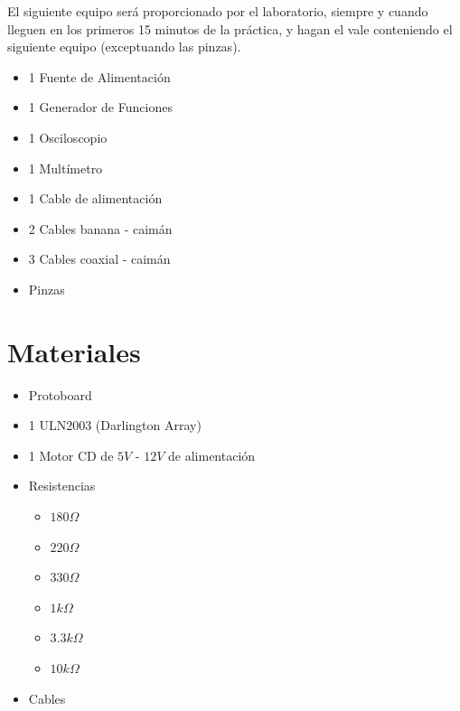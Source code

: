 	El siguiente equipo será proporcionado por el laboratorio, siempre y cuando lleguen en los primeros 15 minutos de la práctica, y hagan el vale conteniendo el siguiente equipo (exceptuando las pinzas).

	\begin{itemize}
		\item 1 Fuente de Alimentación
		\item 1 Generador de Funciones
		\item 1 Osciloscopio
		\item 1 Multímetro
		\item 1 Cable de alimentación
		\item 2 Cables banana - caimán
		\item 3 Cables coaxial - caimán
		\item Pinzas
	\end{itemize}


\section{Materiales}

	\begin{itemize}
		\item Protoboard
		\item 1 ULN2003 (Darlington Array)
		\item 1 Motor CD de $5 V$ - $12 V$ de alimentación
		\item Resistencias
		\begin{itemize}
			\item $180 \Omega$
			\item $220 \Omega$
			\item $330 \Omega$
			\item $1 k\Omega$
			\item $3.3 k\Omega$
			\item $10 k\Omega$
		\end{itemize}
		\item Cables
	\end{itemize}


